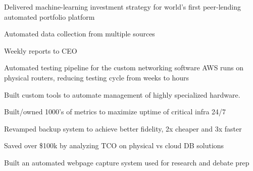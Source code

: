 \documentclass[]{resume}
\begin{document}
\begin{minipage}[t]{1.0\textwidth}
\begin{tightemize}
\item Delivered machine-learning investment strategy for world's first peer-lending automated portfolio platform
\columnbreak
\item Automated data collection from multiple sources
\item Weekly reports to CEO
\end{tightemize}

\begin{tightemize}
\item Automated testing pipeline for the custom networking software AWS runs on physical routers, reducing testing cycle from weeks to hours
\item Built custom tools to automate management of highly specialized hardware.
\end{tightemize}
\sectionsep
\end{minipage}

\begin{tightemize}
\item Built/owned 1000's of metrics to maximize uptime of critical infra 24/7
\item Revamped backup system to achieve better fidelity, 2x cheaper and 3x faster
\item Saved over \$100k by analyzing TCO on physical vs cloud DB solutions
\item Built an automated webpage capture system used for research and debate prep
\end{tightemize}
\end{document}
